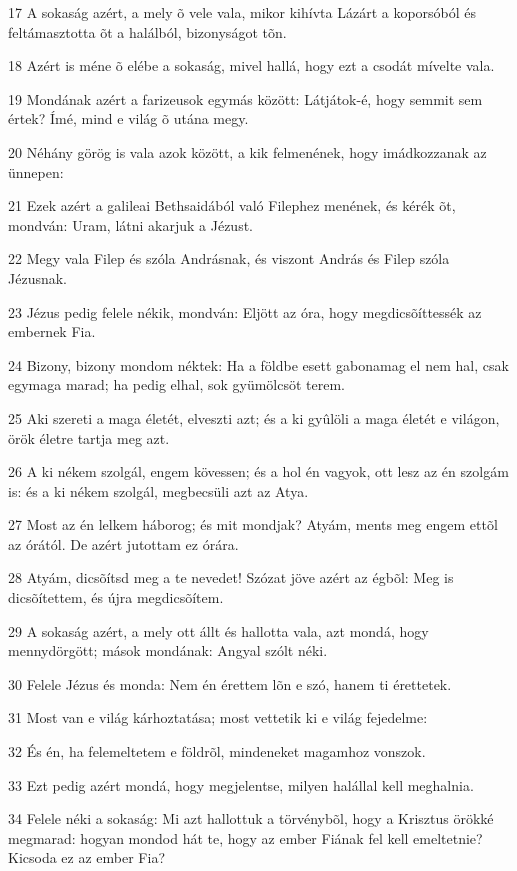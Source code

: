 \par 17 A sokaság azért, a mely õ vele vala, mikor kihívta Lázárt a koporsóból és feltámasztotta õt a halálból, bizonyságot tõn.
\par 18 Azért is méne õ elébe a sokaság, mivel hallá, hogy ezt a csodát mívelte vala.
\par 19 Mondának azért a farizeusok egymás között: Látjátok-é, hogy semmit sem értek? Ímé, mind e világ õ utána megy.
\par 20 Néhány görög is vala azok között, a kik felmenének, hogy imádkozzanak az ünnepen:
\par 21 Ezek azért a galileai Bethsaidából való Filephez menének, és kérék õt, mondván: Uram, látni akarjuk a Jézust.
\par 22 Megy vala Filep és szóla Andrásnak, és viszont András és Filep szóla Jézusnak.
\par 23 Jézus pedig felele nékik, mondván: Eljött az óra, hogy megdicsõíttessék az embernek Fia.
\par 24 Bizony, bizony mondom néktek: Ha a földbe esett gabonamag el nem hal, csak egymaga marad; ha pedig elhal, sok gyümölcsöt terem.
\par 25 Aki szereti a maga életét, elveszti azt; és a ki gyûlöli a maga életét e világon, örök életre tartja meg azt.
\par 26 A ki nékem szolgál, engem kövessen; és a hol én vagyok, ott lesz az én szolgám is: és a ki nékem szolgál, megbecsüli azt az Atya.
\par 27 Most az én lelkem háborog; és mit mondjak? Atyám, ments meg engem ettõl az órától. De azért jutottam ez órára.
\par 28 Atyám, dicsõítsd meg a te nevedet! Szózat jöve azért az égbõl: Meg is dicsõítettem, és újra megdicsõítem.
\par 29 A sokaság azért, a mely ott állt és hallotta vala, azt mondá, hogy mennydörgött; mások mondának: Angyal szólt néki.
\par 30 Felele Jézus és monda: Nem én érettem lõn e szó, hanem ti érettetek.
\par 31 Most van e világ kárhoztatása; most vettetik ki e világ fejedelme:
\par 32 És én, ha felemeltetem e földrõl, mindeneket magamhoz vonszok.
\par 33 Ezt pedig azért mondá, hogy megjelentse, milyen halállal kell meghalnia.
\par 34 Felele néki a sokaság: Mi azt hallottuk a törvénybõl, hogy a Krisztus örökké megmarad: hogyan mondod hát te, hogy az ember Fiának fel kell emeltetnie? Kicsoda ez az ember Fia?
